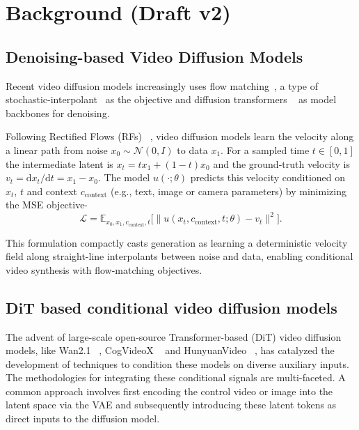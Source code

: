 \section{Background (Draft v2)}
\label{sec:background}


\subsection{Denoising-based Video Diffusion Models}

Recent video diffusion models increasingly uses flow matching~\cite{flow_matching_lipman2022flow}, a type of stochastic-interpolant~\cite{stochastic_interpolants} as the objective  and diffusion transformers ~\cite{peebles2023scalable,flow_matching_ma2024sit} as model backbones for denoising.

Following Rectified Flows (RFs) ~\cite{flow_matching_liu2022flow}, video diffusion models learn the velocity along a linear path from noise $x_0\!\sim\!\mathcal{N}(0,I)$ to data $x_1$. For a sampled time $t\in[0,1]$ the intermediate latent is $x_t = t x_1 + (1-t)x_0$ and the ground-truth velocity is $v_t = \mathrm{d}x_t/\mathrm{d}t = x_1 - x_0$. The model $u(\cdot;\theta)$ predicts this velocity conditioned on $x_t$, $t$ and context $c_{\text{context}}$ (e.g., text, image or camera parameters) by minimizing the MSE objective-
\[
\mathcal{L} = \mathbb{E}_{x_0,x_1,c_{\text{context}},t}\big[\|u(x_t,c_{\text{context}},t;\theta)-v_t\|^2\big].
\]

This formulation compactly casts generation as learning a deterministic velocity field along straight-line interpolants between noise and data, enabling conditional video synthesis with flow-matching objectives.

\subsection{DiT based conditional video diffusion models}

The advent of large-scale open-source Transformer-based (DiT) video diffusion models, like Wan2.1 ~\cite{wan21}, CogVideoX ~\cite{cogvideox} and HunyuanVideo ~\cite{kong2024hunyuanvideo}, has catalyzed the development of techniques to condition these models on diverse auxiliary inputs. The methodologies for integrating these conditional signals are multi-faceted. A common approach involves first encoding the control video or image into the latent space via the VAE and subsequently introducing these latent tokens as direct inputs to the diffusion model.

